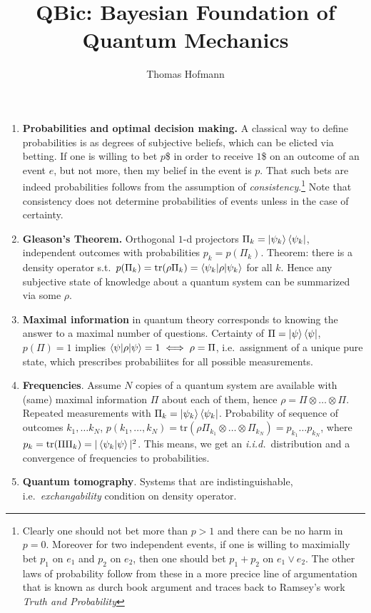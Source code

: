 \documentclass{article}
\author{Thomas Hofmann}
\title{QBic: Bayesian Foundation of \\Quantum Mechanics}
\begin{document}
\maketitle
\begin{enumerate}
\item \textbf{Probabilities and optimal decision making.} A classical way to define probabilities is as degrees of subjective beliefs, which can be elicted via betting. If one is willing to bet $p$\$ in order to receive $1$\$ on an outcome of an event $e$, but not more, then my belief in the event is $p$. That such bets are indeed probabilities follows from the assumption of \textit{consistency}.\footnote{Clearly one should not bet more than $p>1$ and there can be no harm in $p=0$. Moreover for two independent events, if one is willing to maximially bet $p_1$ on $e_1$ and $p_2$ on $e_2$, then one should bet $p_1+p_2$ on $e_1 \vee e_2$. The other laws of probability follow from these in a more precice line of argumentation that is known as durch book argument and traces back to Ramsey's work \textit{Truth and Probability}} Note that consistency does not determine probabilities  of events unless in the case of certainty. 
\item \textbf{Gleason's Theorem.} Orthogonal $1$-d projectors $\Pi_k =\ket{\psi_k} \bra{\psi_k}$, independent outcomes with probabilities $p_k = p(\Pi_k)$. Theorem: there is a  density operator s.t.~$p(\Pi_k) = \text{tr}(\rho \Pi_k) = \braket{\psi_k | \rho | \psi_k}$ for all $k$. Hence any subjective state of knowledge about a quantum system can be summarized via some $\rho$. 
\item \textbf{Maximal information} in quantum theory corresponds to knowing the answer to a maximal number of questions. Certainty of $\Pi= \ket{\psi} \bra{\psi}$, $p(\Pi) =1$ implies $\braket{ \psi | \rho | \psi}=1 \iff \rho = \Pi$, i.e.~assignment of a unique pure state, which prescribes probabiliites for all possible measurements. 
\item \textbf{Frequencies}. Assume $N$ copies of a quantum system are available with (same) maximal information $\Pi$ about each of them, hence $\rho = \Pi \otimes \dots \otimes \Pi$. Repeated measurements with $\Pi_k = \ket{\psi_k} \bra{\psi_k}$. Probability of sequence of outcomes $k_1,\dots k_N$, $p(k_1,\dots,k_N) = \text{tr}(\rho \Pi_{k_1} \otimes \dots \otimes \Pi_{k_N}) = p_{k_1} \dots p_{k_N}$, where $p_{k} = \text{tr}(\Pi \Pi_k) = | \braket{\psi_k | \psi}|^2$. This means, we get an \textit{i.i.d.}~distribution and a convergence of frequencies to probabilities. 
\item \textbf{Quantum tomography}. Systems that are indistinguishable, i.e.~\textit{exchangability} condition on density operator. 
\end{enumerate}
\end{document}
